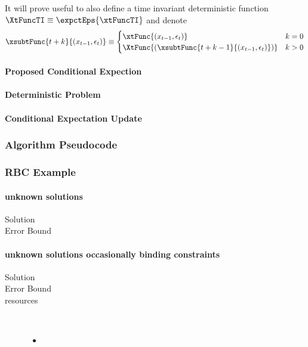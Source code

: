 \documentclass[12pt]{article}
\begin{document}
It will prove useful to also define a time invariant deterministic function $\XtFuncTI\equiv \expctEps{\xtFuncTI}$ and denote
\begin{gather*}
\xsubtFunc{t+k}{(x_{t-1},\epsilon_t)}\equiv\begin{cases}
\xtFunc{(x_{t-1},\epsilon_t)} &k=0\\
\XtFunc{(\xsubtFunc{t+k-1}{(x_{t-1},\epsilon_t)})} &k>0
\end{cases}
\end{gather*}


\paragraph{Proposed Conditional Expection}

\paragraph{Deterministic Problem}

\paragraph{Conditional Expectation Update}

\subsubsection{Algorithm Pseudocode}
\label{sec:pseudocode}

\subsubsection{RBC Example}
\label{sec:generalRBCExample}

\paragraph{unknown solutions}
\begin{description}
\item[Solution]
\item[Error Bound]
\end{description}

\paragraph{unknown solutions occasionally binding constraints}
\begin{description}
\item[Solution]
\item[Error Bound]
\item[resources]\
  \begin{itemize}
  \item 
  \end{itemize}
\end{description}
\end{document}
